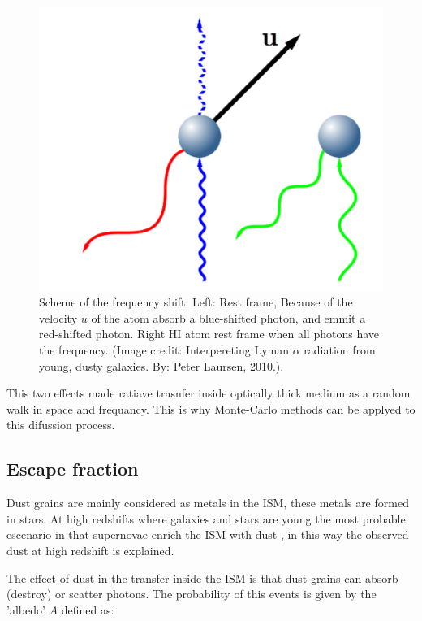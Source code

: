 \begin{figure}[H]\label{fig:xshift}
\begin{center}
\includegraphics[scale=0.4]{../Figures/xshift.png}
\end{center}\caption{Scheme of the frequency shift. Left: Rest frame, Because 
of the velocity $u$ of the atom absorb a blue-shifted \ly photon, and emmit 
a red-shifted \ly photon. Right HI atom rest frame when all photons have the \ly frequency. (Image credit: Interpereting Lyman $\alpha$ radiation from young, dusty galaxies. By: Peter Laursen, 2010.).}
\end{figure}


This two effects made ratiave trasnfer inside optically thick medium as a random 
walk in space and frequancy. This is why Monte-Carlo methods can be
applyed to this difussion process.
 
\subsection{Escape fraction}\label{sec:ef}

Dust grains are mainly considered as metals in the ISM, these
metals are formed in stars. At high redshifts where galaxies and 
stars are young the most probable escenario in that supernovae 
enrich the ISM with dust \citep{Kotak09}, in this way the observed 
dust \citep{Coppin09}  at high redshift is explained. 

The effect of dust in the \ly transfer inside the ISM is that 
dust grains can absorb (destroy) or scatter \ly photons. The 
probability of this events is given by the 'albedo' $A$ defined as:

